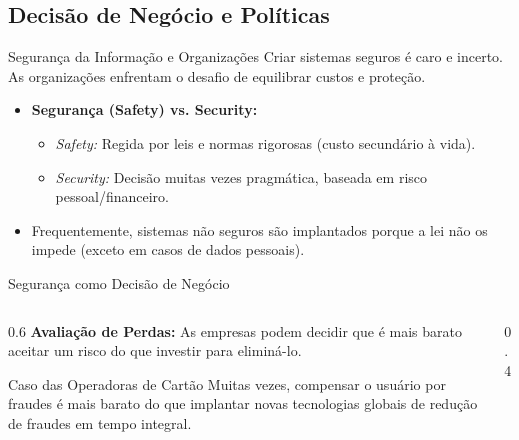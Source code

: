 \documentclass[aspectratio=169]{beamer}
\begin{document}
\subsection{Decisão de Negócio e Políticas}
\begin{frame}{Segurança da Informação e Organizações}
    Criar sistemas seguros é caro e incerto. As organizações enfrentam o desafio de equilibrar custos e proteção.
    \begin{itemize}
        \item \textbf{Segurança (Safety) vs. Security:} 
        \begin{itemize}
            \item \textit{Safety:} Regida por leis e normas rigorosas (custo secundário à vida).
            \item \textit{Security:} Decisão muitas vezes pragmática, baseada em risco pessoal/financeiro.
        \end{itemize}
        \item Frequentemente, sistemas não seguros são implantados porque a lei não os impede (exceto em casos de dados pessoais).
    \end{itemize}
\end{frame}

\begin{frame}{Segurança como Decisão de Negócio}
    \begin{columns}
        \begin{column}{0.6\textwidth}
            \textbf{Avaliação de Perdas:} As empresas podem decidir que é mais barato aceitar um risco do que investir para eliminá-lo.
            \vspace{0.3cm}
            \begin{exampleblock}{Caso das Operadoras de Cartão}
                Muitas vezes, compensar o usuário por fraudes é mais barato do que implantar novas tecnologias globais de redução de fraudes em tempo integral.
            \end{exampleblock}
        \end{column}
        \begin{column}{0.4\textwidth}
            \centering
        \end{column}
    \end{columns}
\end{frame}
\end{document}
